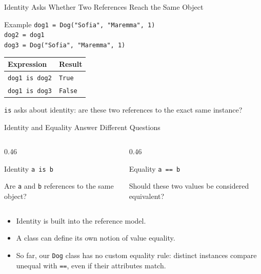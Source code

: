 \documentclass[aspectratio=169,10pt]{beamer}
\begin{document}
\begin{frame}{Identity Asks Whether Two References Reach the Same Object}
  \begin{block}{Example}
    \texttt{dog1 = Dog("Sofia", "Maremma", 1)}\\
    \texttt{dog2 = dog1}\\
    \texttt{dog3 = Dog("Sofia", "Maremma", 1)}
  \end{block}

  \begin{center}
    \renewcommand{\arraystretch}{1.25}
    \begin{tabular}{l|l}
      \textbf{Expression} & \textbf{Result} \\\hline
      \texttt{dog1 is dog2} & \texttt{True} \\
      \texttt{dog1 is dog3} & \texttt{False}
    \end{tabular}
  \end{center}

  \begin{keyidea}
    \texttt{is} asks about identity: are these two references to the exact same instance?
  \end{keyidea}
\end{frame}

\begin{frame}{Identity and Equality Answer Different Questions}
  \begin{columns}[T,onlytextwidth]
    \begin{column}{0.46\textwidth}
      \begin{block}{Identity}
        \texttt{a is b}

        Are \texttt{a} and \texttt{b} references to the same object?
      \end{block}
    \end{column}
    \begin{column}{0.46\textwidth}
      \begin{block}{Equality}
        \texttt{a == b}

        Should these two values be considered equivalent?
      \end{block}
    \end{column}
  \end{columns}

  \begin{itemize}
    \item Identity is built into the reference model.
    \item A class can define its own notion of value equality.
    \item So far, our \texttt{Dog} class has no custom equality rule: distinct instances compare unequal with \texttt{==}, even if their attributes match.
  \end{itemize}
\end{frame}
\end{document}
